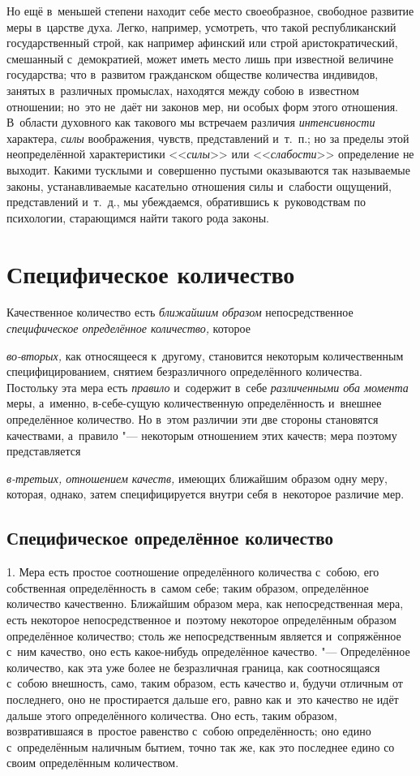 Но ещё в~меньшей степени находит себе место своеобразное, свободное развитие
меры в~царстве духа. Легко, например, усмотреть, что такой республиканский
государственный строй, как например афинский или строй аристократический,
смешанный с~демократией, может иметь место лишь при известной величине
государства; что в~развитом гражданском обществе количества индивидов, занятых
в~различных промыслах, находятся между собою в~известном отношении; но~это
не~даёт ни законов мер, ни особых форм этого отношения. В~области духовного
как такового мы встречаем различия {\em интенсивности} характера, {\em силы}
воображения, чувств, представлений и~т.~п.; но за пределы этой неопределённой
характеристики <<{\em силы}>> или <<{\em слабости}>> определение не выходит.
Какими тусклыми и~совершенно пустыми оказываются так называемые законы,
устанавливаемые касательно отношения силы и~слабости ощущений, представлений
и~т.~д., мы убеждаемся, обратившись к~руководствам по психологии, старающимся
найти такого рода законы.

\section{Специфическое количество}

Качественное количество есть {\em ближайшим образом} непосредственное
{\em специфическое определённое количество,} которое

{\em во-вторых,} как относящееся к~другому, становится некоторым количественным
специфицированием, снятием безразличного определённого количества. Постольку
эта мера есть {\em правило} и~содержит в~себе {\em различенными оба момента}
меры, а~именно, в-себе-сущую количественную определённость и~внешнее
определённое количество. Но в~этом различии эти две стороны становятся
качествами, а~правило "--- некоторым отношением этих качеств; мера поэтому
представляется

{\em в-третьих, отношением качеств,} имеющих ближайшим образом одну меру,
которая, однако, затем специфицируется внутри себя в~некоторое различие мер.

\subsection{Специфическое определённое количество}

1. Мера есть простое соотношение определённого количества с~собою, его
собственная определённость в~самом себе; таким образом, определённое количество
качественно. Ближайшим образом мера, как непосредственная мера, есть некоторое
непосредственное и~поэтому некоторое определённым образом определённое
количество; столь же непосредственным является и~сопряжённое с~ним качество,
оно есть какое-нибудь определённое качество. "--- Определённое количество, как
эта уже более не безразличная граница, как соотносящаяся с~собою внешность,
само, таким образом, есть качество и, будучи отличным от последнего, оно не
простирается дальше его, равно как и~это качество не идёт дальше этого
определённого количества. Оно есть, таким образом, возвратившаяся в~простое
равенство с~собою определённость; оно едино с~определённым наличным бытием,
точно так же, как это последнее едино со своим определённым количеством.

